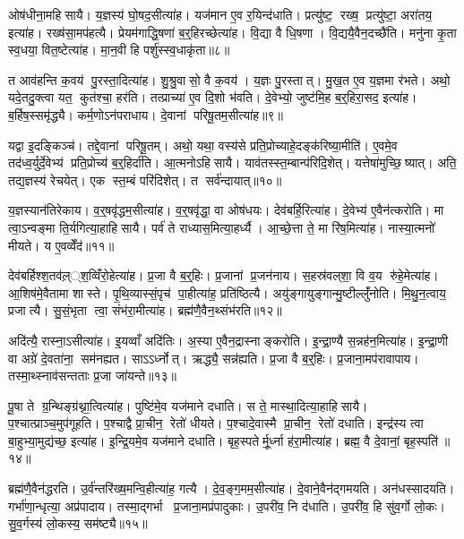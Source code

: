 ओष॑धीना॒महिसायै। य॒ज्ञस्य॑ घो॒षद॒सीत्या॑ह। यज॑मान ए॒व र॒यिन्द॑धाति। प्रत्यु॑ष्ट॒ रख्ष॒ प्रत्यु॑ष्टा॒ अरा॑तय॒ इत्या॑ह। रख्ष॑सा॒मप॑हत्यै। प्रेयम॑गाद्धि॒षणा॑ ब॒र्॒हिरच्छेत्या॑ह। वि॒द्या वै धि॒षणा। वि॒द्ययै॒वैन॒दच्छै॑ति। मनु॑ना कृ॒ता स्व॒धया॒ वित॒ष्टेत्या॑ह। मा॒न॒वी हि पर्\mbox{}शु॑स्स्व॒धाकृ॑ता॥८॥

त आव॑हन्ति क॒वय॑ पु॒रस्ता॒दित्या॑ह। शु॒श्रु॒वासो॒ वै क॒वय॑। य॒ज्ञः पु॒रस्तात्। मु॒ख॒त ए॒व य॒ज्ञमा र॑भते। अथो॒ यदे॒तदु॒क्त्वा यत॒ कुत॑श्चा॒ हर॑ति। तत्प्राच्या॑ ए॒व दि॒शो भ॑वति। दे॒वेभ्यो॒ जुष्ट॑मि॒ह ब॒र्॒हिरा॒सद॒ इत्या॑ह। ब॒र्\mbox{}हिष॒स्समृ॑द्ध्यै। कर्म॒णोऽन॑पराधाय। दे॒वानां परिषू॒तम॒सीत्या॑ह॥९॥

यद्वा इ॒दङ्किञ्च॑। तद्दे॒वानां परिषू॒तम्। अथो॒ यथा॒ वस्य॑से प्रति॒प्रोच्याहे॒दङ्क॑रिष्या॒मीति॑। ए॒वमे॒व तद॑ध्व॒र्युर्दे॒वेभ्य॑ प्रति॒प्रोच्य॑ ब॒र्॒हिर्दा॑ति। आ॒त्मनोऽहिसायै। याव॑तस्स्त॒म्बान्प॑रिदि॒शेत्। यत्तेषा॑मुच्छि॒ष्यात्। अति॒ तद्य॒ज्ञस्य॑ रेचयेत्। एक स्त॒म्बं परि॑दिशेत्। त सर्व॑न्दायात्॥१०॥

य॒ज्ञस्यान॑तिरेकाय। व॒र्॒षवृ॑द्धम॒सीत्या॑ह। व॒र्॒षवृ॑द्धा॒ वा ओष॑धयः। देव॑बर्\mbox{}हि॒रित्या॑ह। दे॒वेभ्य॑ ए॒वैन॑त्करोति। मा त्वा॒ऽन्वङ्मा ति॒र्यगित्या॒हाहिसायै। पर्व॑ ते राध्यास॒मित्या॒हर्ध्यै। आ॒च्छे॒त्ता ते॒ मा रि॑ष॒मित्या॑ह। नास्या॒त्मनो॑ मीयते। य ए॒वव्वेँद॑॥११॥

देव॑बर्\mbox{}हिश्श॒तव॑ल़््श॒व्विँरो॒हेत्या॑ह। प्र॒जा वै ब॒र्॒हिः। प्र॒जानां प्र॒जन॑नाय। स॒हस्र॑वल्‌शा॒ वि व॒य रु॑हे॒मेत्या॑ह। आ॒शिष॑मे॒वैतामा शास्ते। पृ॒थि॒व्यास्सं॒पृच॑ पा॒हीत्या॑ह॒ प्रति॑ष्ठित्यै। अयु॑ङ्गायुङ्गान्मु॒ष्टील्लुँ॑नोति। मि॒थु॒न॒त्वाय॒ प्रजात्यै। सु॒सं॒भृता त्वा॒ संभ॑रा॒मीत्या॑ह। ब्रह्म॑णै॒वैन॒थ्संभ॑रति॥१२॥

अदि॑त्यै॒ रास्ना॒ऽसीत्या॑ह। इ॒यव्वाँ अदि॑तिः। अ॒स्या ए॒वैन॒द्रास्नाङ्करोति। इ॒न्द्रा॒ण्यै स॒न्नह॑न॒मित्या॑ह। इ॒न्द्रा॒णी वा अग्रे॑ दे॒वता॑ना॒ सम॑नह्यत। साऽऽर्ध्नोत्। ऋद्ध्यै॒ सन्न॑ह्यति। प्र॒जा वै ब॒र्॒हिः। प्र॒जाना॒मप॑रावापाय। तस्मा॒थ्स्नाव॑सन्तताः प्र॒जा जा॑यन्ते॥१३॥

पू॒षा ते ग्र॒न्थिङ्ग्र॑थ्ना॒त्वित्या॑ह। पुष्टि॑मे॒व यज॑माने दधाति। स ते॒ मास्था॒दित्या॒हाहिसायै। प॒श्चात्प्राञ्च॒मुप॑गूहति। प॒श्चाद्वै प्रा॒चीन॒ रेतो॑ धीयते। प॒श्चादे॒वास्मै प्रा॒चीन॒ रेतो॑ दधाति। इन्द्र॑स्य त्वा बा॒हुभ्या॒मुद्य॑च्छ॒ इत्या॑ह। इ॒न्द्रि॒यमे॒व यज॑माने दधाति। बृह॒स्पतेर्मू॒र्ध्ना ह॑रा॒मीत्या॑ह। ब्रह्म॒ वै दे॒वानां॒ बृह॒स्पति॑॥१४॥

ब्रह्म॑णै॒वैन॑द्धरति। उ॒र्व॑न्तरि॑ख्ष॒मन्वि॒हीत्या॑ह॒ गत्यै। दे॒व॒ङ्ग॒मम॒सीत्या॑ह। दे॒वाने॒वैन॑द्गमयति। अन॑धस्सादयति। गर्भा॑णा॒न्धृत्या॒ अप्र॑पादाय। तस्मा॒द्गर्भा प्र॒जाना॒मप्र॑पादुकाः। उ॒परी॑व॒ नि द॑धाति। उ॒परी॑व॒ हि सु॑व॒र्गो लो॒कः। सु॒व॒र्गस्य॑ लो॒कस्य॒ सम॑ष्ट्यै॥१५॥\anuvakamend[स॒यो॒नि॒त्वाय॑ स्व॒धाकृ॑ता॒ऽसीत्या॑ह दाया॒द्वेद॑ भरति जायन्ते॒ बृह॒स्पति॒स्सम॑ष्ट्यै]

